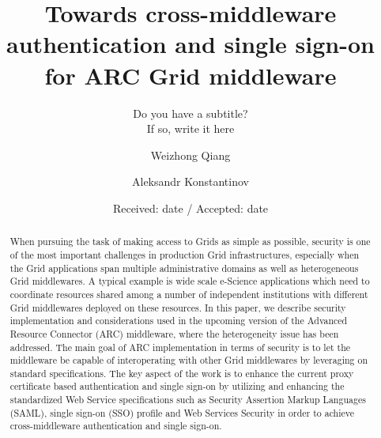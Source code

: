 \documentclass[twocolumn]{svjour3}         %
\begin{document}
\title{Towards cross-middleware authentication and single sign-on for ARC Grid middleware
}
\subtitle{Do you have a subtitle?\\ If so, write it here}


\author{Weizhong Qiang         \and
        Aleksandr Konstantinov %
}



\date{Received: date / Accepted: date}


\maketitle

\begin{abstract}
When pursuing the task of making access to Grids as simple as possible, security is one of the most important challenges in production Grid infrastructures, especially when the Grid applications span multiple administrative domains as well as heterogeneous Grid middlewares. A typical example is wide scale e-Science applications which need to coordinate resources shared among a number of independent institutions with different Grid middlewares deployed on these resources. In this paper, we describe security implementation and considerations used in the upcoming version of the Advanced Resource Connector (ARC) middleware, where the heterogeneity issue has been addressed. The main goal of ARC implementation in terms of security is to let the middleware be capable of interoperating with other Grid middlewares by leveraging on standard specifications. The key aspect of the work is to enhance the current proxy certificate based authentication and single sign-on by utilizing and enhancing the standardized Web Service specifications such as Security Assertion Markup Languages (SAML), single sign-on (SSO) profile and Web Services Security in order to achieve cross-middleware authentication and single sign-on.
\end{abstract}
\end{document}
